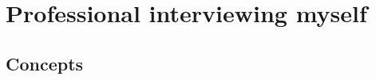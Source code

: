 \section{Professional interviewing myself}
\subsection{Concepts}
\begin{multicols}{2}

\begin{enumerate}


\end{enumerate}
\end{multicols}

